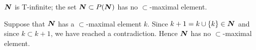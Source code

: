  $\boldsymbol{N}$ is T-infinite; the set $\boldsymbol{N} \subset P(\boldsymbol{N})$ has no 
$\subset$-maximal element.
\begin{solution}
Suppose that $\boldsymbol{N}$ has a $\subset$-maximal element $k$. Since 
$k + 1 = k \cup \{ k \} \in \boldsymbol{N}$ and since $k \subset k + 1$, we have reached a 
contradiction. Hence $\boldsymbol{N}$ has no $\subset$-maximal element.
\end{solution}
